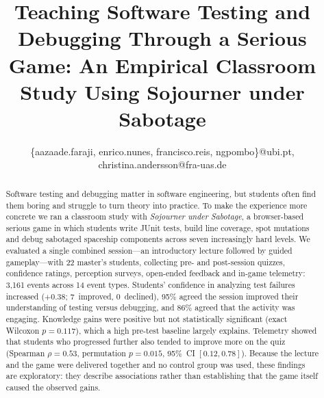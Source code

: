 \documentclass[conference]{IEEEtran}
\begin{document}
\pagestyle{empty}

\title{Teaching Software Testing and Debugging Through a Serious Game: An Empirical Classroom Study Using Sojourner under Sabotage}

\author{
\{aazaade.faraji, enrico.nunes, francisco.reis, ngpombo\}@ubi.pt, christina.andersson@fra-uas.de
}

\maketitle
\thispagestyle{empty}

\begin{abstract}
Software testing and debugging matter in software engineering, but students often find them boring and struggle to turn theory into practice. To make the experience more concrete we ran a classroom study with \emph{Sojourner under Sabotage}, a browser-based serious game in which students write JUnit tests, build line coverage, spot mutations and debug sabotaged spaceship components across seven increasingly hard levels. We evaluated a single combined session---an introductory lecture followed by guided gameplay---with 22 master's students, collecting pre- and post-session quizzes, confidence ratings, perception surveys, open-ended feedback and in-game telemetry: 3,161 events across 14 event types. Students' confidence in analyzing test failures increased ($+0.38$; 7~improved, 0~declined), 95\% agreed the session improved their understanding of testing versus debugging, and 86\% agreed that the activity was engaging. Knowledge gains were positive but not statistically significant (exact Wilcoxon $p = 0.117$), which a high pre-test baseline largely explains. Telemetry showed that students who progressed further also tended to improve more on the quiz (Spearman $\rho = 0.53$, permutation $p = 0.015$, 95\%~CI $[0.12, 0.78]$). Because the lecture and the game were delivered together and no control group was used, these findings are exploratory: they describe associations rather than establishing that the game itself caused the observed gains.

\end{abstract}
\end{document}
